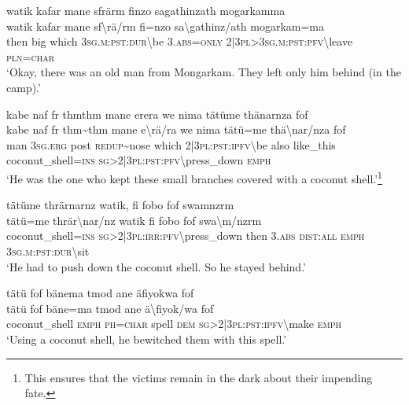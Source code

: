 \ea\label{ex:5:a1538}
watik kafar mane sfrärm finzo sagathinzath mogarkamma\\
\gll watik	kafar	mane	sf{\textbackslash}rä/rm	fi=nzo	sa{\textbackslash}gathinz/ath	mogarkam=ma\\
     then	big	which	3\textsc{sg}.\textsc{m}:\textsc{pst}:\textsc{dur}{\textbackslash}be	3.\textsc{abs}=\textsc{only}	2|3\textsc{pl}>3\textsc{sg}.\textsc{m}:\textsc{pst}:\textsc{pfv}{\textbackslash}leave	\textsc{pln}=\textsc{char}\\
\glt `Okay, there was an old man from Mongarkam. They left only him behind (in the camp).'
\z

\ea\label{ex:5:a1542}
kabe naf fr thmthm mane erera we nima tätüme thänarnza fof\\
\gll kabe	naf	fr	thm{\textasciitilde}thm	mane	e{\textbackslash}rä/ra	we	nima	tätü=me	thä{\textbackslash}nar/nza	fof\\
     man	3\textsc{sg}.\textsc{erg}	post	\textsc{redup}{\textasciitilde}nose	which	2|3\textsc{pl}:\textsc{pst}:\textsc{ipfv}{\textbackslash}be	also	like\_this	coconut\_shell=\textsc{ins}	\textsc{sg}>2|3\textsc{pl}:\textsc{pst}:\textsc{pfv}{\textbackslash}press\_down	\textsc{emph}\\
\glt `He was the one who kept these small branches covered with a coconut shell.'\footnote{This ensures that the victims remain in the dark about their impending fate.}
\z

\ea\label{ex:5:a1543}
tätüme thrärnarnz watik, fi fobo fof swamnzrm\\
\gll tätü=me	thrär{\textbackslash}nar/nz	watik	fi	fobo	fof	swa{\textbackslash}m/nzrm\\
     coconut\_shell=\textsc{ins}	\textsc{sg}>2|3\textsc{pl}:\textsc{irr}:\textsc{pfv}{\textbackslash}press\_down	then	3.\textsc{abs}	\textsc{dist}:\textsc{all}	\textsc{emph}	3\textsc{sg}.\textsc{m}:\textsc{pst}:\textsc{dur}{\textbackslash}sit\\
\glt `He had to push down the coconut shell. So he stayed behind.'
\z

\ea\label{ex:5:a1544}
tätü fof bänema tmod ane äfiyokwa fof\\
\gll tätü	fof	bäne=ma	tmod	ane	ä{\textbackslash}fiyok/wa	fof\\
     coconut\_shell	\textsc{emph}	\textsc{ph}=\textsc{char}	spell	\textsc{dem}	\textsc{sg}>2|3\textsc{pl}:\textsc{pst}:\textsc{ipfv}{\textbackslash}make	\textsc{emph}\\
\glt `Using a coconut shell, he bewitched them with this spell.'
\z

